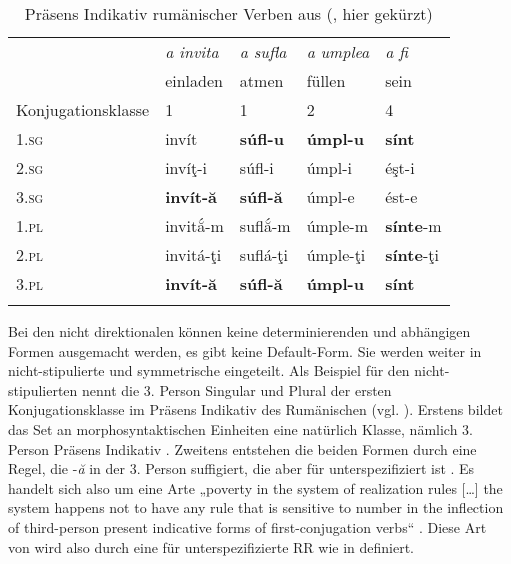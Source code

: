 \begin{exe}
\begin{exe}
\begin{table}
\caption{Präsens Indikativ rumänischer Verben aus (\citealt[214]{Stump2001}, hier gekürzt)}\label{table4.8}
\begin{tabularx}{\textwidth}{lXXXX} 
\lsptoprule
 & \textit{a invita}  & \textit{a sufla}  & \textit{a umplea}  & \textit{a fi} \\
 & einladen & atmen & füllen & sein\\\midrule
Konjugationsklasse & 1 & 1 & 2 & 4\\\midrule
\textsc{1.sg} & invít & \textbf{súfl-u} & \textbf{úmpl-u} & \textbf{sínt}\\
\textsc{2.sg} & invíţ-i & súfl-i & úmpl-i & éşt-i\\
\textsc{3.sg} & \textbf{invít-ă} & \textbf{súfl-ă} & úmpl-e & ést-e\\
\textsc{1.pl} & invitắ-m & suflắ-m & úmple-m & \textbf{sínte}-m\\
\textsc{2.pl} & invitá-ţi & suflá-ţi & úmple-ţi & \textbf{sínte}-ţi\\
\textsc{3.pl} & \textbf{invít-ă} & \textbf{súfl-ă} & \textbf{úmpl-u} & \textbf{sínt}\\
\lspbottomrule
\end{tabularx}
\end{table}

Bei den nicht direktionalen  können keine determinierenden und abhängigen Formen ausgemacht werden, es gibt keine Default-Form. Sie werden weiter in nicht-stipulierte und symmetrische  eingeteilt. Als Beispiel für den nicht-stipulierten  nennt \citet{Stump2001} die 3. Person Singular und Plural der ersten Konjugationsklasse im Präsens Indikativ des Rumänischen (vgl. ). Erstens bildet das Set an morphosyntaktischen Einheiten eine natürlich Klasse, nämlich 3. Person Präsens Indikativ \citep[213]{Stump2001}. Zweitens entstehen die beiden Formen durch eine Regel, die -\textit{ă} in der 3. Person suffigiert, die aber für  unterspezifiziert ist \citep[213–215]{Stump2001}. Es handelt sich also um eine Arte „poverty in the system of realization rules […] the system happens not to have any rule that is sensitive to number in the inflection of third-person present indicative forms of first-conjugation verbs“ \citep[215]{Stump2001}. Diese Art von  wird also durch eine für  unterspezifizierte RR wie in  definiert.


\end{exe}
\end{exe}
